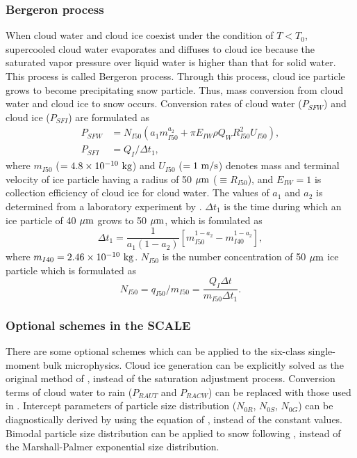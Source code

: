\subsubsection{Bergeron process}
When cloud water and cloud ice coexist under the condition of $T < T_{0}$, supercooled cloud water evaporates and diffuses to cloud ice because the saturated vapor pressure over liquid water is higher than that for solid water. This process is called Bergeron process. Through this process, cloud ice particle grows to become precipitating snow particle. Thus, mass conversion from cloud water and cloud ice to snow occurs. Conversion rates of cloud water ($P_{SFW}$) and cloud ice ($P_{SFI}$) are formulated as
\begin{align}
  P_{SFW}&=N_{I50}(a_{1}m^{a_{2}}_{I50}+\pi E_{IW}\rho Q_{W}R^2_{I50}U_{I50}), \\
  P_{SFI}&=Q_{I}/\Delta t_{1},
\end{align}
where $m_{I50}$ ($=4.8\times10^{-10} {\rm \ kg}$) and $U_{I50}$ ($=1{\rm \ m/s}$) denotes mass and terminal velocity of ice particle having a radius of 50 ${\rm \mu m}$ ($\equiv R_{I50}$), and $E_{IW}=1$ is collection efficiency of cloud ice for cloud water. The values of $a_{1}$ and $a_{2}$ is determined from a laboratory experiment by \citet{koenig_1971}. $\Delta t_{1}$ is the time during which an ice particle of 40 ${\rm \mu m}$ grows to 50 ${\rm \mu m}$, which is fomulated as
\begin{equation}
  \Delta t_{1}=\frac{1}{a_{1}(1-a_{2})}\left[m^{1-a_{2}}_{I50}-m^{1-a_{2}}_{I40}\right],
\end{equation}
where $m_{I40}=2.46\times10^{-10} {\rm \ kg}$. $N_{I50}$ is the number concentration of 50 ${\rm \mu m}$ ice particle which is formulated as
\begin{equation}
  N_{I50}=q_{I50}/m_{I50}=\frac{Q_{I}\Delta t}{m_{I50}\Delta t_{1}}.
\end{equation}

\subsubsection{Optional schemes in the SCALE}
There are some optional schemes which can be applied to the six-class single-moment bulk microphysics. Cloud ice generation can be explicitly solved as the original method of \citet{lin_etal_1983}, instead of the saturation adjustment process. Conversion terms of cloud water to rain ($P_{RAUT}$ and $P_{RACW}$) can be replaced with those used in \citet{khairoutdinov_and_kogan_2000}. Intercept parameters of particle size distribution ($N_{0R}$, $N_{0S}$, $N_{0G}$) can be diagnostically derived by using the equation of \citet{wainwright_etal_2014}, instead of the constant values. Bimodal particle size distribution can be applied to snow following \citet{roh_and_satoh_2007}, instead of the Marshall-Palmer exponential size distribution.
